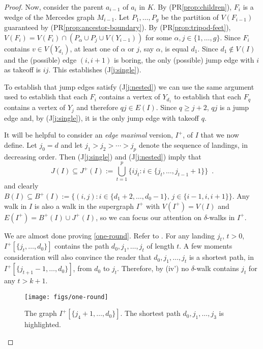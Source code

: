 \documentclass{patmorin}
\renewcommand{\propref}[1]{(PR\ref{prop:#1})}
\newcommand{\jref}[1]{(J\ref{j:#1})}
\begin{document}
\begin{proof}
  Now, consider the parent $a_{i-1}$ of $a_i$ in $K$.  By \propref{children}, $F_i$ is a wedge of the Mercedes graph $M_{i-1}$.  Let $P_1,\ldots,P_g$ be the partition of $V(F_{i-1})$ guaranteed by \propref{ancestor-boundary}.
  By \propref{tripod-feet}, $V(F_i) = V(F_i)\cap(P_\alpha \cup P_j\cup V(Y_{i-1}))$ for some $\alpha,j\in \{1,\ldots,g\}$.  Since $F_i$ contains $v\in V(Y_{d_1})$, at least one of $\alpha$ or $j$, say $\alpha$, is equal $d_1$. Since $d_1\not\in V(I)$ and the (possible) edge $(i,i+1)$ is boring, the only (possible) jump edge with $i$ as takeoff is $ij$. This establishes \jref{single}. 
  
  To establish that jump edges satisfy \jref{nested} we can use the same argument used to establish that each $F_i$ contains a vertex of $Y_{d_1}$ to establish that each $F_q$ contains a vertex of $Y_j$ and therefore $qj\in E(I)$.  Since $q \ge j+2$, $qj$ is a jump edge and, by \jref{single}, it is the only jump edge with takeoff $q$. 

  It will be helpful to consider an \emph{edge maximal} version, $I^+$, of $I$ that we now define.  Let $j_0=d$ and let $j_1>j_2>\cdots> j_p$ denote the sequence of landings, in decreasing order.  Then \jref{single} and \jref{nested} imply that
  \[
      J(I) \subseteq J^+(I) :=
         \bigcup_{t=1}^p \{ ij_t : i\in\{ j_t,\ldots,j_{t-1}+1 \}\} \enspace . 
  \]
  and clearly $B(I)\subseteq B^+(I) := \{(i,j): i\in\{d_1+2,\ldots,d_0-1\},\, j\in\{i-1,i,i+1\}\}$.
  Any walk in $I$ is also a walk in the supergraph $I^+$ with $V(I^+)=V(I)$ and $E(I^+)=B^+(I)\cup J^+(I)$, so we can focus our attention on $\delta$-walks in $I^+$.
  
  We are almost done proving \eqref{one-round}. Refer to .  For any landing $j_t$, $t>0$, $I^+[\{j_t,\ldots,d_0\}]$ contains the path $d_0,j_1,\ldots,j_t$ of length $t$.  A few moments consideration will also convince the reader that $d_0,j_1,\ldots,j_t$ is a shortest path, in $I^+[\{j_{t+1}-1,\ldots,d_0\}]$, from $d_0$ to $j_t$.  Therefore, by (iv') no $\delta$-walk contains $j_t$ for any $t> k+1$.
  
  \begin{figure}
    \begin{center}
      \texttt{[image: figs/one-round]}
    \end{center}
    \caption{The graph $I^+[\{j_{4}+1,\ldots,d_0\}]$.  The shortest path $d_0,j_1,\ldots,j_3$ is highlighted.}
  \end{figure}
  

\end{proof}
\end{document}
